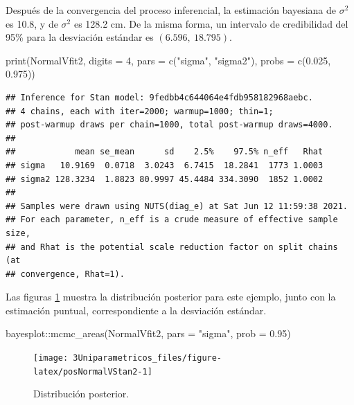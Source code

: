 \documentclass[
  10pt,
  spanish,
]{book}
\newenvironment{Shaded}{\begin{snugshade}}{\end{snugshade}}
\newcommand{\AttributeTok}[1]{\textcolor[rgb]{0.77,0.63,0.00}{#1}}
\newcommand{\DecValTok}[1]{\textcolor[rgb]{0.00,0.00,0.81}{#1}}
\newcommand{\FloatTok}[1]{\textcolor[rgb]{0.00,0.00,0.81}{#1}}
\newcommand{\FunctionTok}[1]{\textcolor[rgb]{0.00,0.00,0.00}{#1}}
\newcommand{\NormalTok}[1]{#1}
\newcommand{\SpecialCharTok}[1]{\textcolor[rgb]{0.00,0.00,0.00}{#1}}
\newcommand{\StringTok}[1]{\textcolor[rgb]{0.31,0.60,0.02}{#1}}
\theoremstyle{definition}
\theoremstyle{definition}
\theoremstyle{definition}
\theoremstyle{definition}
\theoremstyle{remark}
\begin{document}
Después de la convergencia del proceso inferencial, la estimación bayesiana de \(\sigma^2\) es 10.8, y de \(\sigma^2\) es 128.2 cm. De la misma forma, un intervalo de credibilidad del 95\% para la desviación estándar es \((6.596,\ 18.795)\).

\begin{Shaded}
\begin{Highlighting}[]
\FunctionTok{print}\NormalTok{(NormalVfit2, }\AttributeTok{digits =} \DecValTok{4}\NormalTok{, }
      \AttributeTok{pars =} \FunctionTok{c}\NormalTok{(}\StringTok{"sigma"}\NormalTok{, }\StringTok{"sigma2"}\NormalTok{), }\AttributeTok{probs =} \FunctionTok{c}\NormalTok{(}\FloatTok{0.025}\NormalTok{, }\FloatTok{0.975}\NormalTok{))}
\end{Highlighting}
\end{Shaded}

\begin{verbatim}
## Inference for Stan model: 9fedbb4c644064e4fdb958182968aebc.
## 4 chains, each with iter=2000; warmup=1000; thin=1; 
## post-warmup draws per chain=1000, total post-warmup draws=4000.
## 
##            mean se_mean      sd    2.5%    97.5% n_eff   Rhat
## sigma   10.9169  0.0718  3.0243  6.7415  18.2841  1773 1.0003
## sigma2 128.3234  1.8823 80.9997 45.4484 334.3090  1852 1.0002
## 
## Samples were drawn using NUTS(diag_e) at Sat Jun 12 11:59:38 2021.
## For each parameter, n_eff is a crude measure of effective sample size,
## and Rhat is the potential scale reduction factor on split chains (at 
## convergence, Rhat=1).
\end{verbatim}

Las figuras \ref{fig:posNormalVStan2} muestra la distribución posterior para este ejemplo, junto con la estimación puntual, correspondiente a la desviación estándar.

\begin{Shaded}
\begin{Highlighting}[]
\NormalTok{bayesplot}\SpecialCharTok{::}\FunctionTok{mcmc\_areas}\NormalTok{(NormalVfit2, }\AttributeTok{pars =} \StringTok{"sigma"}\NormalTok{, }
                      \AttributeTok{prob =} \FloatTok{0.95}\NormalTok{)}
\end{Highlighting}
\end{Shaded}

\begin{figure}

{\centering \texttt{[image: 3Uniparametricos\_files/figure-latex/posNormalVStan2-1]} 

}

\caption{Distribución posterior.}\label{fig:posNormalVStan2}
\end{figure}
\end{document}
